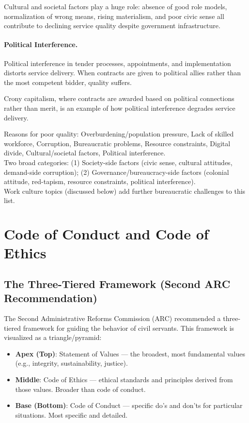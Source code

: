\begin{CriticalPoint}
Cultural and societal factors play a huge role: absence of good role models, normalization of wrong means, rising materialism, and poor civic sense all contribute to declining service quality despite government infrastructure.
\end{CriticalPoint}

\paragraph{Political Interference.} Political interference in tender processes, appointments, and implementation distorts service delivery. When contracts are given to political allies rather than the most competent bidder, quality suffers.

\begin{ExampleBox}
Crony capitalism, where contracts are awarded based on political connections rather than merit, is an example of how political interference degrades service delivery.
\end{ExampleBox}

\begin{QuickRevision}
Reasons for poor quality: Overburdening/population pressure, Lack of skilled workforce, Corruption, Bureaucratic problems, Resource constraints, Digital divide, Cultural/societal factors, Political interference.\\
Two broad categories: (1) Society-side factors (civic sense, cultural attitudes, demand-side corruption); (2) Governance/bureaucracy-side factors (colonial attitude, red-tapism, resource constraints, political interference).\\
Work culture topics (discussed below) add further bureaucratic challenges to this list.
\end{QuickRevision}

\section{Code of Conduct and Code of Ethics}

\subsection{The Three-Tiered Framework (Second ARC Recommendation)}
The Second Administrative Reforms Commission (ARC) recommended a three-tiered framework for guiding the behavior of civil servants. This framework is visualized as a triangle/pyramid:
\begin{itemize}
\item \textbf{Apex (Top)}: Statement of Values --- the broadest, most fundamental values (e.g., integrity, sustainability, justice).
\item \textbf{Middle}: Code of Ethics --- ethical standards and principles derived from those values. Broader than code of conduct.
\item \textbf{Base (Bottom)}: Code of Conduct --- specific do's and don'ts for particular situations. Most specific and detailed.
\end{itemize}

